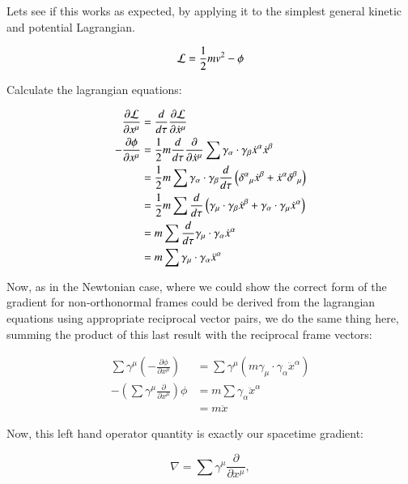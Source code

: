 \documentclass{article}
\newcommand{\grad}[0] {\nabla}
\begin{document}
Lets see if this works as expected, by applying it to the simplest general
kinetic and potential Lagrangian.

\begin{equation}
\mathcal{L} = \frac{1}{2} m v^2 - \phi
\end{equation}

Calculate the lagrangian equations:

\begin{align*}
\frac{\partial \mathcal{L}}{\partial x^{\mu}} &= \frac{d}{d\tau} \frac{\partial \mathcal{L}}{\partial \dot{x}^{\mu}} \\
- \frac{\partial \phi}{\partial x^{\mu}} 
&= \frac{1}{2} m \frac{d}{d\tau} \frac{\partial}{\partial \dot{x}^{\mu}} \sum \gamma_{\alpha} \cdot \gamma_{\beta} \dot{x}^{\alpha} \dot{x}^{\beta} \\
&= \frac{1}{2} m \sum \gamma_{\alpha} \cdot \gamma_{\beta} \frac{d}{d\tau} \left({\delta^{\alpha}}_{\mu} \dot{x}^{\beta} + \dot{x}^{\alpha} {\delta^{\beta}}_{\mu}\right) \\
&= \frac{1}{2} m \sum \frac{d}{d\tau}
\left(\gamma_{\mu} \cdot \gamma_{\beta} \dot{x}^{\beta} + \gamma_{\alpha} \cdot \gamma_{\mu} \dot{x}^{\alpha} \right) \\
&= m \sum \frac{d}{d\tau} \gamma_{\mu} \cdot \gamma_{\alpha} \dot{x}^{\alpha} \\
&= m \sum \gamma_{\mu} \cdot \gamma_{\alpha} \ddot{x}^{\alpha} \\
\end{align*}

Now, as in the Newtonian case, where we could show the correct form of the gradient for non-orthonormal frames could be derived from the lagrangian equations using appropriate reciprocal vector pairs, we do the same thing here, summing the product of this last result with the reciprocal frame vectors:

\begin{align*}
\sum \gamma^{\mu} \left(- \frac{\partial \phi}{\partial x^{\mu}}\right) &= \sum \gamma^{\mu} \left(m \gamma_{\mu} \cdot \gamma_{\alpha} \ddot{x}^{\alpha}\right) \\
- \left(\sum \gamma^{\mu} \frac{\partial}{\partial x^{\mu}}\right) \phi 
&= m \sum \gamma_{\alpha} \ddot{x}^{\alpha} \\
&= m \ddot{x}
\end{align*}

Now, this left hand operator quantity is exactly our spacetime gradient:

\begin{equation}
\grad = \sum \gamma^{\mu} \frac{\partial}{\partial x^{\mu}},
\end{equation}
\end{document}
